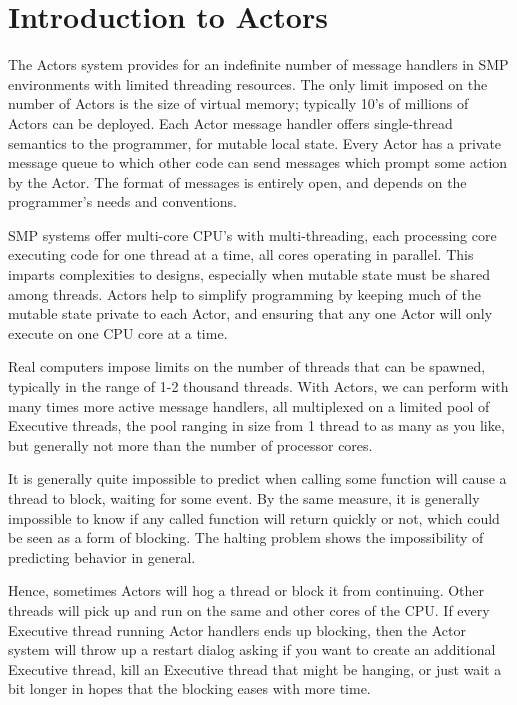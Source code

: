 \documentclass[article,oneside]{memoir}
\begin{document}

\chapter{Introduction to Actors}

The Actors system provides for an indefinite number of message handlers in SMP environments with limited threading resources. The only limit imposed on the number of Actors is the size of virtual memory; typically 10's of millions of Actors can be deployed. Each Actor message handler offers single-thread semantics to the programmer, for mutable local state. Every Actor has a private message queue to which other code can send messages which prompt some action by the Actor. The format of messages is entirely open, and depends on the programmer's needs and conventions.

SMP systems offer multi-core CPU's with multi-threading, each processing core executing code for one thread at a time, all cores operating in parallel. This imparts complexities to designs, especially when mutable state must be shared among threads. Actors help to simplify programming by keeping much of the mutable state private to each Actor, and ensuring that any one Actor will only execute on one CPU core at a time.

Real computers impose limits on the number of threads that can be spawned, typically in the range of 1-2 thousand threads. With Actors, we can perform with many times more active message handlers, all multiplexed on a limited pool of Executive threads, the pool ranging in size from 1 thread to as many as you like, but generally not more than the number of processor cores.

It is generally quite impossible to predict when calling some function will cause a thread to block, waiting for some event. By the same measure, it is generally impossible to know if any called function will return quickly or not, which could be seen as a form of blocking. The halting problem shows the impossibility of predicting behavior in general. 

Hence, sometimes Actors will hog a thread or block it from continuing. Other threads will pick up and run on the same and other cores of the CPU. If every Executive thread running Actor handlers ends up blocking, then the Actor system will throw up a restart dialog asking if you want to create an additional Executive thread, kill an Executive thread that might be hanging, or just wait a bit longer in hopes that the blocking eases with more time.
\end{document}
